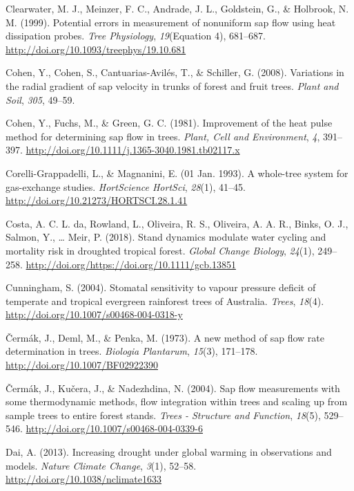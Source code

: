 \documentclass[11pt,twoside]{reedthesis}
\begin{document}
\hypertarget{ref-Clearwater1999}{}
Clearwater, M. J., Meinzer, F. C., Andrade, J. L., Goldstein, G., \&
Holbrook, N. M. (1999). Potential errors in measurement of nonuniform
sap flow using heat dissipation probes. \emph{Tree Physiology},
\emph{19}(Equation 4), 681--687.
\url{http://doi.org/10.1093/treephys/19.10.681}

\hypertarget{ref-Cohen2008}{}
Cohen, Y., Cohen, S., Cantuarias-Avilés, T., \& Schiller, G. (2008).
Variations in the radial gradient of sap velocity in trunks of forest
and fruit trees. \emph{Plant and Soil}, \emph{305}, 49--59.

\hypertarget{ref-Cohen1981}{}
Cohen, Y., Fuchs, M., \& Green, G. C. (1981). Improvement of the heat
pulse method for determining sap flow in trees. \emph{Plant, Cell and
Environment}, \emph{4}, 391--397.
\url{http://doi.org/10.1111/j.1365-3040.1981.tb02117.x}

\hypertarget{ref-Corelli1993}{}
Corelli-Grappadelli, L., \& Magnanini, E. (01 Jan. 1993). A whole-tree
system for gas-exchange studies. \emph{HortScience HortSci},
\emph{28}(1), 41--45. \url{http://doi.org/10.21273/HORTSCI.28.1.41}

\hypertarget{ref-daCosta2018}{}
Costa, A. C. L. da, Rowland, L., Oliveira, R. S., Oliveira, A. A. R.,
Binks, O. J., Salmon, Y., \ldots{} Meir, P. (2018). Stand dynamics
modulate water cycling and mortality risk in droughted tropical forest.
\emph{Global Change Biology}, \emph{24}(1), 249--258.
\url{http://doi.org/https://doi.org/10.1111/gcb.13851}

\hypertarget{ref-cunningham_stomatal_2004}{}
Cunningham, S. (2004). Stomatal sensitivity to vapour pressure deficit
of temperate and tropical evergreen rainforest trees of Australia.
\emph{Trees}, \emph{18}(4).
\url{http://doi.org/10.1007/s00468-004-0318-y}

\hypertarget{ref-cermak1973}{}
Čermák, J., Deml, M., \& Penka, M. (1973). A new method of sap flow rate
determination in trees. \emph{Biologia Plantarum}, \emph{15}(3),
171--178. \url{http://doi.org/10.1007/BF02922390}

\hypertarget{ref-Cermak2004}{}
Čermák, J., Kučera, J., \& Nadezhdina, N. (2004). Sap flow measurements
with some thermodynamic methods, flow integration within trees and
scaling up from sample trees to entire forest stands. \emph{Trees -
Structure and Function}, \emph{18}(5), 529--546.
\url{http://doi.org/10.1007/s00468-004-0339-6}

\hypertarget{ref-Dai2013}{}
Dai, A. (2013). Increasing drought under global warming in observations
and models. \emph{Nature Climate Change}, \emph{3}(1), 52--58.
\url{http://doi.org/10.1038/nclimate1633}
\end{document}
